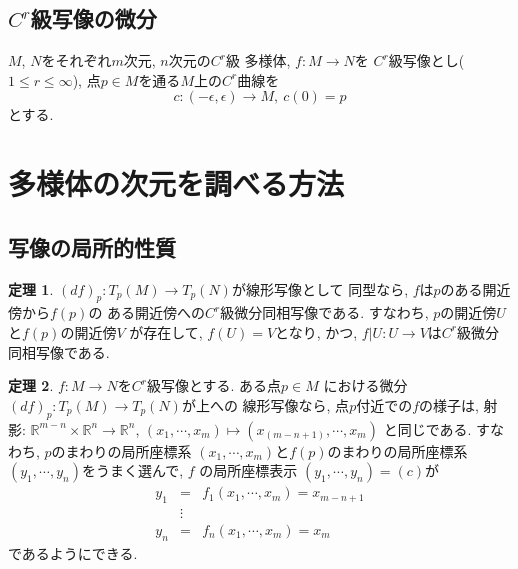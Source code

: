 \documentclass[a4j,12pt]{jarticle}
\theoremstyle{definition}
\newtheorem{theorem}{定理}[section]
\begin{document}
\subsection{$C^r$級写像の微分}
$M$, $N$をそれぞれ$m$次元, $n$次元の$C^r$級
多様体, $f:M\to N$を
$C^r$級写像とし($1 \leq r\leq \infty$), 
点$p\in M$を通る$M$上の$C^r$曲線を
$$c:(-\epsilon, \epsilon)\to M,\ c(0)=p$$
とする. 

\newpage
\section{多様体の次元を調べる方法}
\subsection{写像の局所的性質}
\begin{theorem}\label{theo:f^(-1)theorem}
    $(df)_p:T_p(M)\to T_p(N)$が線形写像として
    同型なら, $f$は$p$のある開近傍から$f(p)$の
    ある開近傍への$C^r$級微分同相写像である. 
    すなわち, $p$の開近傍$U$と$f(p)$の開近傍$V$
    が存在して, $f(U)=V$となり, かつ, 
    $f|U:U \to V$は$C^r$級微分同相写像である. 
\end{theorem}
\begin{theorem}\label{theo: projection theorem}
    $f:M\to N$を$C^r$級写像とする. ある点$p\in M$
    における微分$(df)_p:T_p(M)\to T_p(N)$が上への
    線形写像なら, 点$p$付近での$f$の様子は, 射影:
    $\mathbb{R}^{m-n} \times \mathbb{R}^n \to \mathbb{R}^n$, 
    $(x_1, \cdots ,x_m)\mapsto (x_(m-n+1), \cdots ,x_m)$
    と同じである. すなわち, $p$のまわりの局所座標系
    $(x_1,\cdots ,x_m)$と$f(p)$のまわりの局所座標系
    $(y_1, \cdots ,y_n)$をうまく選んで, $f$
    の局所座標表示
    $(y_1, \cdots ,y_n)=(c)$が
    \begin{eqnarray*}
        y_1&=&f_1(x_1,\cdots ,x_m)=x_{m-n+1}\\
        &\vdots& \\
        y_n&=&f_n(x_1,\cdots ,x_m)=x_m
    \end{eqnarray*}
    であるようにできる. 
\end{theorem}
\end{document}
